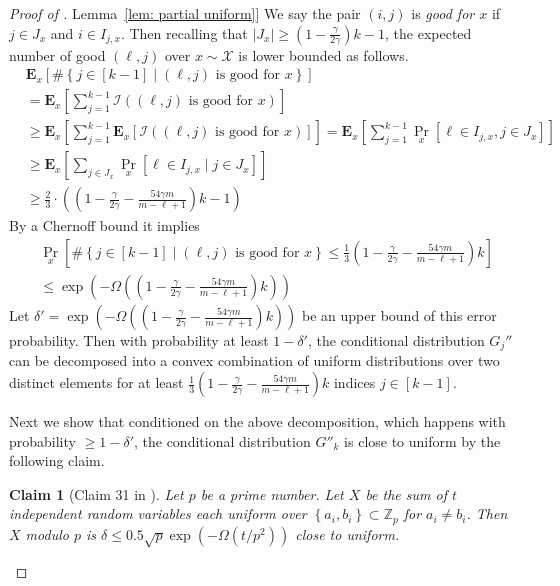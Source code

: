 \documentclass[11pt]{article}
\numberwithin{equation}{section}
\newtheorem{claim}[theorem]{Claim}
\theoremstyle{definition}
\theoremstyle{plain}
\newcommand{\Z}{\mathbb Z}
\newcommand{\expref}[2]{\hyperref[#2]{#1~\ref{#2}}}
\newcommand{\set}[1]{{\left \{{#1} \right \}}}
\newcommand{\st}{\;|\;}
\newcommand{\cond}{\;|\;}
\newcommand{\follows}{\ensuremath{\sim}}
\newcommand{\error}{\ensuremath{\delta}}
\newcommand{\bigomega}[1]{\ensuremath{{\Omega \left( {#1} \right)}}}
\newcommand{\E}{\ensuremath{\mathbf{E}}}
\begin{document}
\begin{proof}[Proof of \expref{Lemma}{lem: partial uniform}]
		We say the pair $(i,j)$ is \emph{good for $x$} if $j\in J_{x}$ and $i\in I_{j,x}$.
		Then recalling that $|J_x|\ge \left(1-\frac{\gamma}{2\gamma}\right)k-1$, the expected number of good $(\ell,j)$ over $x\follows\mathcal{X}$ is lower bounded as follows.
		\begin{align*}
			& \E_x\left[ \#\set{j\in [k-1]\st \text{$(\ell,j)$ is good for $x$}} \right]  \\
			&= \E_x\left[ \sum_{j=1}^{k-1} \mathcal{I}\left(\text{$(\ell,j)$ is good for $x$}\right) \right] \\
			&\ge  \E_x\left[ \sum_{j=1}^{k-1} \E_x\left[\mathcal{I}\left(\text{$(\ell,j)$ is good for $x$}\right)\right] \right] 
			= \E_x\left[ \sum_{j=1}^{k-1} \Pr_x[\ell \in I_{j,x}, j\in J_x] \right]\\
			&\ge  \E_x\left[ \sum_{j\in J_x} \Pr_x[\ell \in I_{j,x}\cond j\in J_x] \right] \\
			&\ge  \frac{2}{3}\cdot\left(\left(1-\frac{\gamma}{2\gamma}- \frac {54\gamma m}{m-\ell+1}\right)k-1\right)
		\end{align*}
		By a Chernoff bound it implies
		\begin{align*}
			& \Pr_x\left[ \#\set{j\in [k-1]\st \text{$(\ell,j)$ is good for $x$}} \le \frac{1}{3} \left(1-\frac{\gamma}{2\gamma} - \frac {54\gamma m}{m-\ell+1}\right)k \right]\\
		&\le \exp\left( -\bigomega{\left(1-\frac{\gamma}{2\gamma}- \frac {54\gamma m}{m-\ell+1}\right)k} \right)
		\end{align*}
		Let $\error' = \exp\left( -\bigomega{\left(1-\frac{\gamma}{2\gamma}- \frac {54\gamma m}{m-\ell+1}\right)k} \right)$ be an upper bound of this error probability.
		Then with probability at least $1-\error'$, the conditional distribution %
		$G_j''$ can be decomposed into a convex combination of uniform distributions over two distinct elements for at least $\frac{1}{3} \left(1-\frac{\gamma}{2\gamma}- \frac {54\gamma m}{m-\ell+1}\right)k$ indices $j\in [k-1]$.

		Next we show that conditioned on the above decomposition, 
		which happens with probability $\ge 1-\error'$,
		the conditional distribution $G''_k$ is close to uniform by the following claim.
		\begin{claim}[Claim 31 in \cite{Viola:2013we}]
			Let $p$ be a prime number. 
			Let $X$ be the sum of $t$ independent random variables each uniform over $\set{a_i,b_i}\subset\Z_p$ for $a_i\ne b_i$.
			Then $X$ modulo $p$ is $\error\le 0.5\sqrt{p}\exp\left(-\bigomega{t/p^2} \right)$ close to uniform.
		\end{claim}
		

\end{proof}
\end{document}
